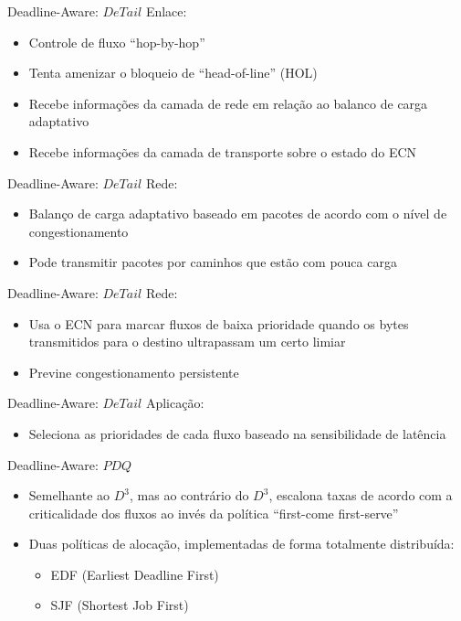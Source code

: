 \documentclass[aspectratio=169]{beamer}
\begin{document}
	\begin{frame} {Deadline-Aware: $DeTail$}
		Enlace:
		\begin{itemize}
		 	\item
		 		Controle de fluxo “hop-by-hop” 
		 	\item
				Tenta amenizar o bloqueio de “head-of-line” (HOL)
		 	\item
				Recebe informações da camada de rede em relação ao balanco de carga adaptativo
		 	\item
				Recebe informações da camada de transporte sobre o estado do ECN
		 \end{itemize}
	\end{frame}

	\begin{frame} {Deadline-Aware: $DeTail$}
		Rede:
		\begin{itemize}
		 	\item
		 		Balanço de carga adaptativo baseado em pacotes de acordo com o nível de congestionamento
		 	\item
				Pode transmitir pacotes por caminhos que estão com pouca carga
		 \end{itemize}
	\end{frame}

	\begin{frame} {Deadline-Aware: $DeTail$}
		Rede:
		\begin{itemize}
		 	\item
		 		Usa o ECN para marcar fluxos de baixa prioridade quando os bytes transmitidos para o destino ultrapassam um certo limiar
		 	\item
				Previne congestionamento persistente
		 \end{itemize}
	\end{frame}

	\begin{frame} {Deadline-Aware: $DeTail$}
		Aplicação:
		\begin{itemize}
		 	\item
		 		Seleciona as prioridades de cada fluxo baseado na sensibilidade de latência
		 \end{itemize}
	\end{frame}

	\begin{frame} {Deadline-Aware: $PDQ$}
		\begin{itemize}
		 	\item
		 		Semelhante ao $D^3$, mas ao contrário do $D^3$, escalona taxas de acordo com a criticalidade dos fluxos ao invés da política “first-come first-serve”
		 	\item
		 		Duas políticas de alocação, implementadas de forma totalmente distribuída:
				\begin{itemize}
				 	\item
				 		EDF (Earliest Deadline First)
				 	\item
						SJF (Shortest Job First)
				 \end{itemize}
		\end{itemize}
	\end{frame}
\end{document}
